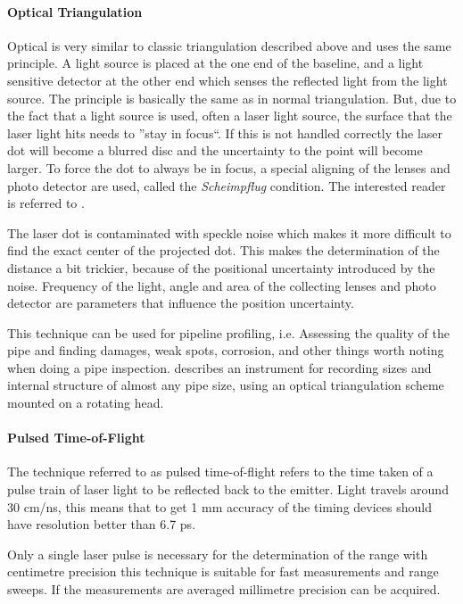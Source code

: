 \paragraph{Optical Triangulation}
Optical is very similar to classic triangulation described above and uses the same principle.
A light source is placed at the one end of the
baseline, and a light sensitive detector at the other end which senses the reflected light from the
light source. The principle is basically the same as in normal triangulation. But, due to
the fact that a light source is used, often a laser light source, the surface
that the laser light hits needs to ''stay in focus``. If this is not handled correctly the laser dot will become a
blurred disc and the uncertainty to the point will become larger. To force the dot to
always be in focus, a special aligning of the lenses and photo detector are used, called 
the \emph{Scheimpflug} condition. The interested reader is referred to
\cite{laser-ranging-critical-review}.

The laser dot is contaminated with speckle noise which makes it more difficult to find the
exact center of the projected dot. This makes the determination of the 
distance a bit trickier, because of the positional uncertainty introduced by the
noise. Frequency of the light, angle and area of the collecting lenses and photo detector
are parameters that influence the position uncertainty. 

This technique can be used for pipeline profiling, i.e. Assessing the quality of the pipe
and finding damages, weak spots, corrosion, and other things worth noting when doing a pipe
inspection. \cite{optical-pipe-inspection} describes an instrument for recording sizes and
internal structure of almost any pipe size, using an optical triangulation scheme mounted
on a rotating head. 


\paragraph{Pulsed Time-of-Flight}
\label{chap2:subsec-lrf}
The technique referred to as pulsed time-of-flight refers to the time taken of a pulse
train of laser light to be reflected back to the emitter. Light travels around 30 cm/ns,
this means that to get 1 mm accuracy of the timing devices should have resolution better
than 6.7 ps.

Only a single laser pulse is necessary for the determination of the range with centimetre
precision this technique is suitable for fast measurements and range sweeps. If the
measurements are averaged millimetre precision can be acquired. 


